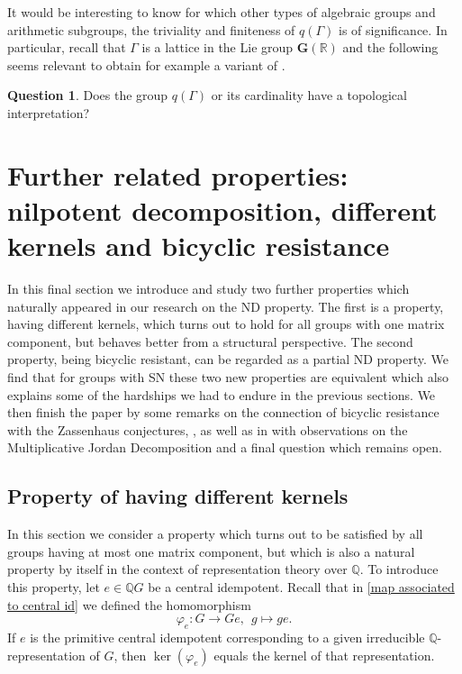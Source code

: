 \documentclass[a4paper,10pt]{amsart}
\theoremstyle{definition}
\newtheorem{question}[lemma]{Question}
\theoremstyle{remark}
\newcommand{\Q}{{\mathbb Q}}
\newcommand{\R}{{\mathbb R}}
\begin{document}
It would be interesting to know for which other types of algebraic groups and arithmetic subgroups, the triviality and finiteness of $q(\Gamma)$ is of significance. In particular, recall that $\Gamma$ is a lattice in the Lie group $\mathbf{G}(\R)$ and the following seems relevant to obtain for example a variant of .

\begin{question}
Does the group $q(\Gamma)$ or its cardinality have a topological interpretation?
\end{question}


\section{Further related properties:  nilpotent decomposition, different kernels and bicyclic resistance}\label{sec:DK prop section}

In this final section we introduce and study two further properties which naturally appeared in our research on the ND property. The first is a property, having different kernels,  which turns out to hold for all groups with one matrix component, but behaves better from a structural perspective. The second property, being bicyclic resistant, can be regarded as a partial ND property. We find that for groups with SN these two new properties are equivalent which also explains some of the hardships we had to endure in the previous sections.
We then finish the paper by some remarks on the connection of bicyclic resistance with the Zassenhaus conjectures, , as well as in  with observations on the Multiplicative Jordan Decomposition and a final question which remains open.

\subsection{Property of having different kernels}\label{section DK examples}%
In this section we consider a property which turns out to be satisfied by all groups having at most one matrix component, but which is also a natural property by itself in the context of representation theory over $\Q$. To introduce this property, let $e \in \mathbb{Q}G$ be a central idempotent. Recall that in \eqref{map associated to central id} we defined the homomorphism
\[\varphi_e: G \rightarrow Ge, \ \ g \mapsto ge. \]
If $e$ is the primitive central idempotent corresponding to a given irreducible $\mathbb{Q}$-representation of $G$, then $\ker(\varphi_e)$ equals the kernel of that representation. 
\end{document}
